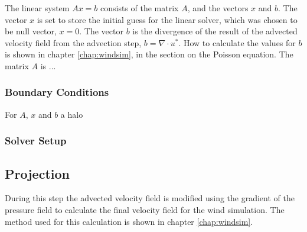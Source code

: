 The linear system $Ax = b$ consists of the matrix $A$, and the vectors $x$ and
$b$. The vector $x$ is set to store the initial guess for the linear solver,
which was chosen to be null vector, $x = 0$. The vector $b$ is the divergence of
the result of the advected velocity field from the advection step, $b = \nabla
\cdot u^*$. How to calculate the values for $b$ is shown in chapter 
\ref{chap:windsim}, in the section on the Poisson equation. The matrix $A$ is
...

\subsubsection{Boundary Conditions}

For $A$, $x$ and $b$ a halo 


\subsubsection{Solver Setup}

\subsection{Projection}

During this step the advected velocity field is modified using the gradient of
the pressure field to calculate the final velocity field for the wind simulation.
The method used for this calculation is shown in chapter \ref{chap:windsim}.
